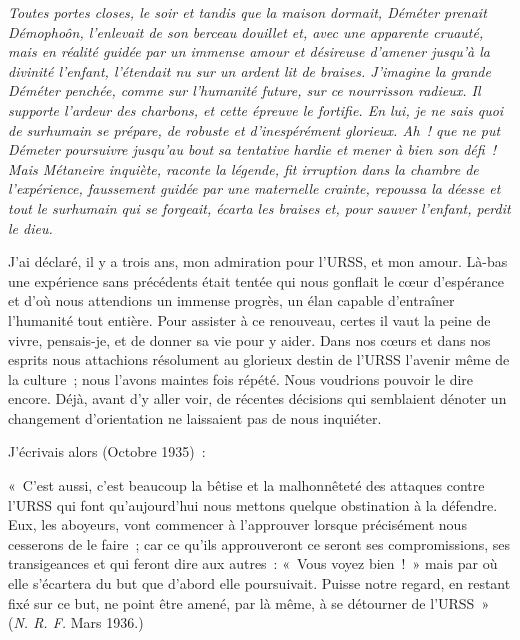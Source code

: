 \documentclass[french,twoside]{book} %
\newenvironment{quoteblock}%
  {\begin{quoting}}
  {\end{quoting}}
\newenvironment{quotebar}{%
    \def\FrameCommand{{\color{rubric!10!}\vrule width 0.5em} \hspace{0.9em}}%
    \def\OuterFrameSep{\itemsep} %
    \MakeFramed {\advance\hsize-\width \FrameRestore}
  }%
  {%
    \endMakeFramed
  }
\renewenvironment{quoteblock}%
  {%
    \savenotes
    \setstretch{0.9}
    \normalfont
    \begin{quotebar}
  }
  {%
    \end{quotebar}
    \spewnotes
  }
\begin{document}
\par
{\itshape Toutes portes closes, le soir et tandis que la maison dormait, Déméter prenait Démophoôn, l’enlevait de son berceau douillet et, avec une apparente cruauté, mais en réalité guidée par un immense amour et désireuse d’amener jusqu’à la divinité l’enfant, l’étendait nu sur un ardent lit de braises. J’imagine la grande Déméter penchée, comme sur l’humanité future, sur ce nourrisson radieux. Il supporte l’ardeur des charbons, et cette épreuve le fortifie. En lui, je ne sais quoi de surhumain se prépare, de robuste et d’inespérément glorieux. Ah ! que ne put Démeter poursuivre jusqu’au bout sa tentative hardie et mener à bien son défi ! Mais Métaneire inquiète, raconte la légende, fit irruption dans la chambre de l’expérience, faussement guidée par une maternelle crainte, repoussa la déesse et tout le surhumain qui se forgeait, écarta les braises et, pour sauver l’enfant, perdit le dieu.}\par
J’ai déclaré, il y a trois ans, mon admiration pour l’URSS, et mon amour. Là-bas une expérience sans précédents était tentée qui nous gonflait le cœur d’espérance et d’où nous attendions un immense progrès, un élan capable d’entraîner l’humanité tout entière. Pour assister à ce renouveau, certes il vaut la peine de vivre, pensais-je, et de donner sa vie pour y aider. Dans nos cœurs et dans nos esprits nous attachions résolument au glorieux destin de l’URSS l’avenir même de la culture ; nous l’avons maintes fois répété. Nous voudrions pouvoir le dire encore. Déjà, avant d’y aller voir, de récentes décisions qui semblaient dénoter un changement d’orientation ne laissaient pas de nous inquiéter.\par
J’écrivais alors (Octobre 1935) :\par

\begin{quoteblock}
 \noindent « C’est aussi, c’est beaucoup la bêtise et la malhonnêteté des attaques contre l’URSS qui font qu’aujourd’hui nous mettons quelque obstination à la défendre. Eux, les aboyeurs, vont commencer à l’approuver lorsque précisément nous cesserons de le faire ; car ce qu’ils approuveront ce seront ses compromissions, ses transigeances et qui feront dire aux autres : « Vous voyez bien ! » mais par où elle s’écartera du but que d’abord elle poursuivait. Puisse notre regard, en restant fixé sur ce but, ne point être amené, par là même, à se détourner de l’URSS » (\emph{N. R. F.} Mars 1936.)
\end{quoteblock}
\end{document}
